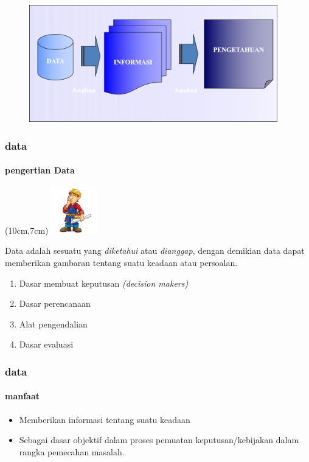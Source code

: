 \documentclass[main.tex]{subfiles}
\begin{document}
\begin{frame}[c]
	\begin{figure}
		\begin{center}
			\includegraphics[height=2in]{figures/data}
		\end{center}
	\end{figure}
\end{frame}

\begin{frame}[t]
	\frametitle{data}
	\framesubtitle{pengertian Data}
	\begin{textblock*}{2cm}(10cm,7cm) %
		\includegraphics[width=2cm]{figures/cons}
	\end{textblock*}
	Data adalah sesuatu yang \textit{diketahui} atau \textit{dianggap}, dengan demikian data dapat memberikan gambaran tentang suatu keadaan atau persoalan.
	\begin{enumerate}
		\item Dasar membuat keputusan \textit{(decision makers)}
		\item Dasar perencanaan
		\item Alat pengendalian
		\item Dasar evaluasi
	\end{enumerate}
\end{frame}

\begin{frame}[c]
	\frametitle{data}
	\framesubtitle{manfaat}
	\begin{itemize}
		\item Memberikan informasi tentang suatu keadaan
		\item Sebagai  dasar objektif  dalam proses pemuatan keputusan/kebijakan dalam rangka  pemecahan masalah.

	\end{itemize}
\end{frame}
\end{document}
